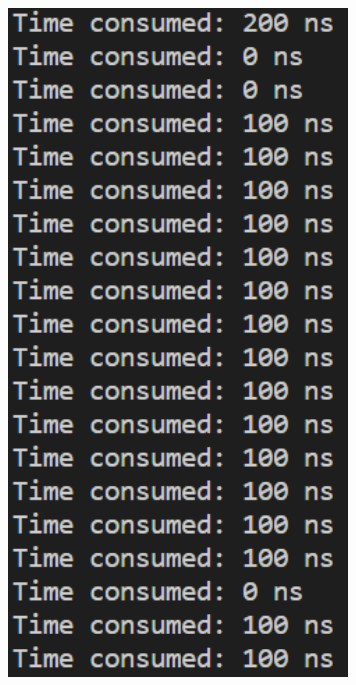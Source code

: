 \documentclass[a4paper,12pt]{article}
\begin{document}
\begin{figure}[H]
{\begin{minipage}[t]{0.4\textwidth}
        \includegraphics[width = 0.802\textwidth]{N = 16, Asm optimization.png}
    \end{minipage}}
\end{figure}
\end{document}
